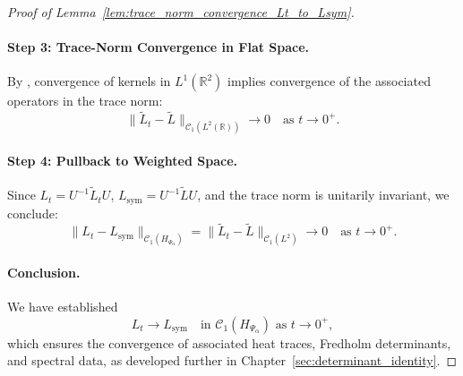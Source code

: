 \begin{proof}[Proof of Lemma~\ref{lem:trace_norm_convergence_Lt_to_Lsym}]
\paragraph{Step 3: Trace-Norm Convergence in Flat Space.}
By \cite[Thm.~3.1]{Simon2005TraceIdeals}, convergence of kernels in \( L^1(\mathbb{R}^2) \) implies convergence of the associated operators in the trace norm:
\[
\| \widetilde{L}_t - \widetilde{L} \|_{\mathcal{C}_1(L^2(\mathbb{R}))} \to 0 \quad \text{as } t \to 0^+.
\]

\paragraph{Step 4: Pullback to Weighted Space.}
Since \( L_t = U^{-1} \widetilde{L}_t U \), \( L_{\mathrm{sym}} = U^{-1} \widetilde{L} U \), and the trace norm is unitarily invariant, we conclude:
\[
\| L_t - L_{\mathrm{sym}} \|_{\mathcal{C}_1(H_{\Psi_\alpha})} = \| \widetilde{L}_t - \widetilde{L} \|_{\mathcal{C}_1(L^2)} \to 0 \quad \text{as } t \to 0^+.
\]

\paragraph{Conclusion.}
We have established
\[
L_t \to L_{\mathrm{sym}} \quad \text{in } \mathcal{C}_1(H_{\Psi_\alpha}) \text{ as } t \to 0^+,
\]
which ensures the convergence of associated heat traces, Fredholm determinants, and spectral data, as developed further in Chapter~\ref{sec:determinant_identity}.
\end{proof}
% 